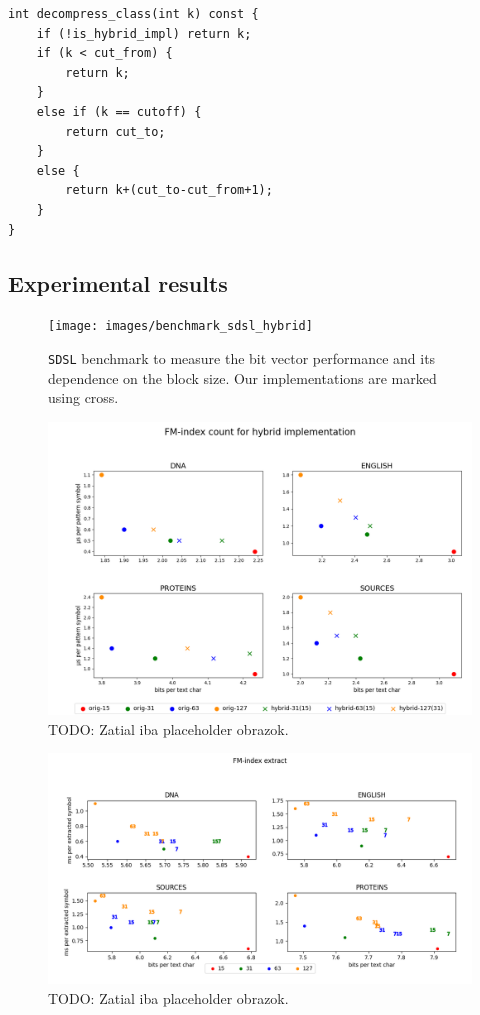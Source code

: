 \begin{lstlisting}
int decompress_class(int k) const {
	if (!is_hybrid_impl) return k;
	if (k < cut_from) {
		return k;
	}
	else if (k == cutoff) {
		return cut_to;
	}
	else {
		return k+(cut_to-cut_from+1);
	}
}
\end{lstlisting}

\subsection{Experimental results}

\begin{figure}
	\centerline{
		\texttt{[image: images/benchmark\_sdsl\_hybrid]}
	}
	\caption[TODO]{\texttt{SDSL} benchmark to measure the bit vector performance and its dependence
	on the block size. Our implementations are marked using cross.
	}
	\label{obr:benchmark_sdsl_hybrid}
\end{figure}

\begin{figure}
	\centerline{
		\includegraphics[width=\textwidth, height=0.4\textheight]{images/vysledky_sdsl_hybrid_count}
	}
	\caption[TODO]{TODO: Zatial iba placeholder obrazok.
	}
	\label{obr:benchmark_sdsl_hybrid_count}
\end{figure}

\begin{figure}
	\centerline{
		\includegraphics[width=\textwidth, height=0.4\textheight]{images/vysledky_sdsl_hybrid_extract}
	}
	\caption[TODO]{TODO: Zatial iba placeholder obrazok.
	}
	\label{obr:benchmark_sdsl_hybrid_extract}
\end{figure}


